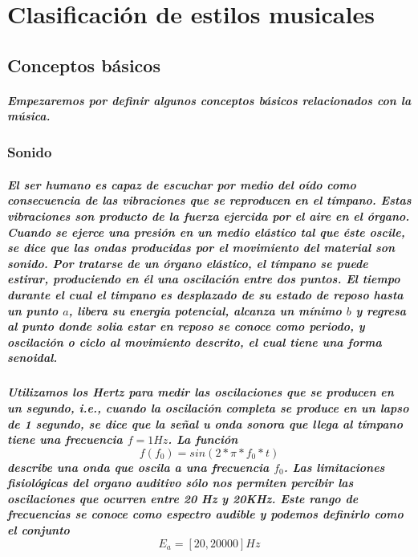 \chapter{Clasificación de estilos musicales}

\section{Conceptos básicos}
\paragraph{Empezaremos por definir algunos conceptos básicos relacionados con la música.}


\subsection{Sonido}
    \paragraph{El ser humano es capaz de escuchar por medio del oído como consecuencia de las vibraciones que se reproducen en el tímpano. Estas vibraciones son producto de la fuerza ejercida por el aire en el órgano. Cuando se ejerce una presión en un medio elástico tal que éste oscile, se dice que las ondas producidas por el movimiento del material son sonido. Por tratarse de un órgano elástico, el tímpano se puede estirar, produciendo en él una oscilación entre dos puntos. El tiempo durante el cual el timpano es desplazado de su estado de reposo hasta un punto $a$, libera su energia potencial, alcanza un mínimo $b$ y regresa al punto donde solia estar en reposo se conoce como periodo, y oscilación o ciclo al movimiento descrito, el cual tiene una forma senoidal.}

    \paragraph{Utilizamos los Hertz para medir las oscilaciones que se producen en un segundo, i.e., cuando la oscilación completa se produce en un lapso de 1 segundo, se dice que la señal u onda sonora que llega al tímpano tiene una frecuencia $f = 1 Hz$. La función $$f(f_0) = sin(2*\pi*f_0*t)$$
    describe una onda que oscila a una frecuencia $f_0$. Las limitaciones fisiológicas del organo auditivo sólo nos permiten percibir las oscilaciones que ocurren entre 20 Hz y 20KHz. Este rango de frecuencias se conoce como espectro audible y podemos definirlo como el conjunto $$ E_a = [20, 20000] Hz$$}


